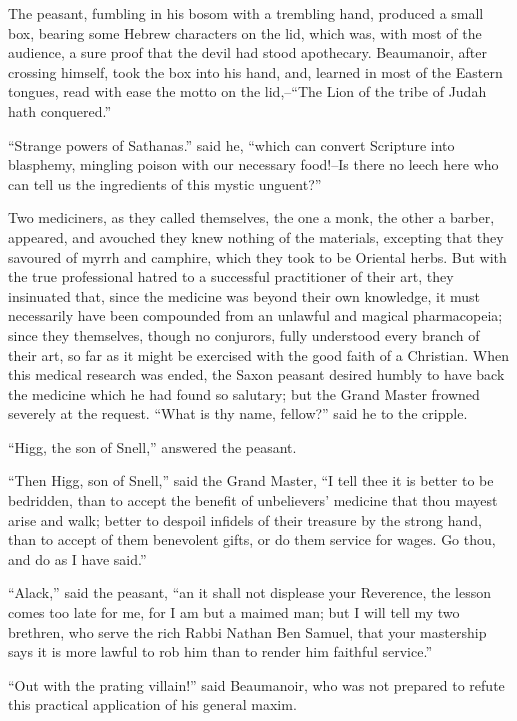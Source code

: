 The peasant, fumbling in his bosom with a trembling hand, produced a
small box, bearing some Hebrew characters on the lid, which was, with
most of the audience, a sure proof that the devil had stood apothecary.
Beaumanoir, after crossing himself, took the box into his hand, and,
learned in most of the Eastern tongues, read with ease the motto on the
lid,--``The Lion of the tribe of Judah hath conquered.''

``Strange powers of Sathanas.'' said he, ``which can convert Scripture
into blasphemy, mingling poison with our necessary food!--Is there no
leech here who can tell us the ingredients of this mystic unguent?''

Two mediciners, as they called themselves, the one a monk, the other a
barber, appeared, and avouched they knew nothing of the materials,
excepting that they savoured of myrrh and camphire, which they took to
be Oriental herbs. But with the true professional hatred to a successful
practitioner of their art, they insinuated that, since the medicine was
beyond their own knowledge, it must necessarily have been compounded
from an unlawful and magical pharmacopeia; since they themselves, though
no conjurors, fully understood every branch of their art, so far as it
might be exercised with the good faith of a Christian. When this medical
research was ended, the Saxon peasant desired humbly to have back the
medicine which he had found so salutary; but the Grand Master frowned
severely at the request. ``What is thy name, fellow?'' said he to the
cripple.

``Higg, the son of Snell,'' answered the peasant.

``Then Higg, son of Snell,'' said the Grand Master, ``I tell thee it is
better to be bedridden, than to accept the benefit of unbelievers'
medicine that thou mayest arise and walk; better to despoil infidels of
their treasure by the strong hand, than to accept of them benevolent
gifts, or do them service for wages. Go thou, and do as I have said.''

``Alack,'' said the peasant, ``an it shall not displease your Reverence,
the lesson comes too late for me, for I am but a maimed man; but I will
tell my two brethren, who serve the rich Rabbi Nathan Ben Samuel, that
your mastership says it is more lawful to rob him than to render him
faithful service.''

``Out with the prating villain!'' said Beaumanoir, who was not prepared
to refute this practical application of his general maxim.

